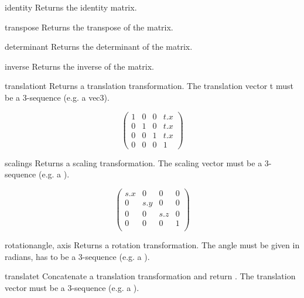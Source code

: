 \begin{methoddesc}{identity}{}
Returns the identity matrix. 
\end{methoddesc}

\begin{methoddesc}{transpose}{}
Returns the transpose of the matrix.
\end{methoddesc}

\begin{methoddesc}{determinant}{}
Returns the determinant of the matrix.
\end{methoddesc}

\begin{methoddesc}{inverse}{}
Returns the inverse of the matrix.
\end{methoddesc}

\begin{methoddesc}{translation}{t}
Returns a translation transformation. The translation vector t must be a
3-sequence (e.g. a vec3).

\[ \left( \begin{array}{cccc}
1 & 0 & 0 & t.x \\
0 & 1 & 0 & t.x \\
0 & 0 & 1 & t.x \\
0 & 0 & 0 & 1 
\end{array} \right) \]

\end{methoddesc}

\begin{methoddesc}{scaling}{s}
Returns a scaling transformation. The scaling vector  must be a
3-sequence (e.g. a ).

\[ \left( \begin{array}{cccc}
s.x & 0 & 0 & 0\\
0 & s.y & 0 & 0\\
0 & 0 & s.z & 0\\
0 & 0 & 0 & 1\\
\end{array} \right) \]
\end{methoddesc}

\begin{methoddesc}{rotation}{angle, axis}
Returns a rotation transformation. The angle must be given in radians,
 has to be a 3-sequence (e.g. a ).
\end{methoddesc}

\begin{methoddesc}{translate}{t}
Concatenate a translation transformation and return . The
translation vector  must be a 3-sequence (e.g. a ).
\end{methoddesc}

